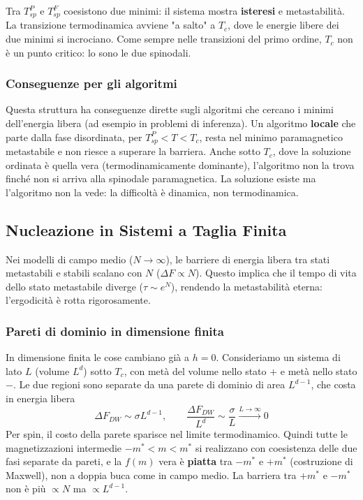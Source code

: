 Tra $T_{sp}^{P}$ e $T_{sp}^{F}$ coesistono due minimi: il sistema mostra \textbf{isteresi} e metastabilità. La transizione termodinamica avviene "a salto" a $T_c$, dove le energie libere dei due minimi si incrociano. Come sempre nelle transizioni del primo ordine, $T_c$ non è un punto critico: lo sono le due spinodali.

\subsubsection*{Conseguenze per gli algoritmi}
Questa struttura ha conseguenze dirette sugli algoritmi che cercano i minimi dell'energia libera (ad esempio in problemi di inferenza). Un algoritmo \textbf{locale} che parte dalla fase disordinata, per $T_{sp}^{P} < T < T_c$, resta nel minimo paramagnetico metastabile e non riesce a superare la barriera. Anche sotto $T_c$, dove la soluzione ordinata è quella vera (termodinamicamente dominante), l'algoritmo non la trova finché non si arriva alla spinodale paramagnetica. La soluzione esiste ma l'algoritmo non la vede: la difficoltà è dinamica, non termodinamica.

\subsection{Nucleazione in Sistemi a Taglia Finita}

Nei modelli di campo medio ($N \to \infty$), le barriere di energia libera tra stati metastabili e stabili scalano con $N$ ($\Delta F \propto N$). Questo implica che il tempo di vita dello stato metastabile diverge ($\tau \sim e^N$), rendendo la metastabilità eterna: l'ergodicità è rotta rigorosamente.

\subsubsection*{Pareti di dominio in dimensione finita}
In dimensione finita le cose cambiano già a $h=0$. Consideriamo un sistema di lato $L$ (volume $L^d$) sotto $T_c$, con metà del volume nello stato $+$ e metà nello stato $-$. Le due regioni sono separate da una parete di dominio di area $L^{d-1}$, che costa in energia libera
\begin{equation}
    \Delta F_{DW} \sim \sigma L^{d-1}, \qquad \frac{\Delta F_{DW}}{L^d} \sim \frac{\sigma}{L} \xrightarrow{L \to \infty} 0
\end{equation}
Per spin, il costo della parete sparisce nel limite termodinamico. Quindi tutte le magnetizzazioni intermedie $-m^* < m < m^*$ si realizzano con coesistenza delle due fasi separate da pareti, e la $f(m)$ vera è \textbf{piatta} tra $-m^*$ e $+m^*$ (costruzione di Maxwell), non a doppia buca come in campo medio. La barriera tra $+m^*$ e $-m^*$ non è più $\propto N$ ma $\propto L^{d-1}$.


